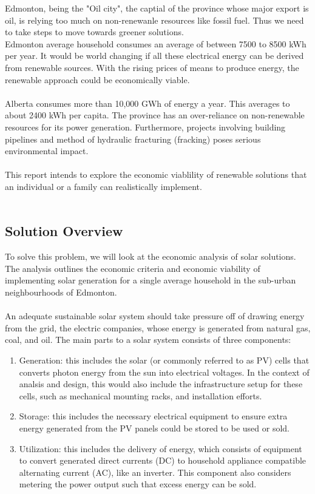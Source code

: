 \documentclass[10pt,letterpaper]{article}
\begin{document}
Edmonton, being the "Oil city", the captial of the province whose major export is oil, is relying too much on non-renewanle resources like fossil fuel. Thus we need to take steps to move towards greener solutions.\\

Edmonton average household consumes an average of between 7500 to 8500 kWh per year. It would be world changing if all these electrical energy can be derived from renewable sources. With the rising prices of means to produce energy, the renewable approach could be economically viable.\\
\\
Alberta consumes more than 10,000 GWh of energy a year. This averages to about 2400 kWh per capita\cite{average-albertan-consumption}. The province has an over-reliance on non-renewable resources for its power generation. Furthermore, projects involving building pipelines and method of hydraulic fracturing (fracking) poses serious environmental impact\cite{fracking-kurzgesagt}.\\
\\
This report intends to explore the economic viablility of renewable solutions that an individual or a family can realistically implement.\\
\\

\subsection{Solution Overview}

To solve this problem, we will look at the economic analysis of solar solutions. The analysis outlines the economic criteria and economic viability of implementing solar generation for a single average household in the sub-urban neighbourhoods of Edmonton.\\
\\
An adequate sustainable solar system should take pressure off of drawing energy from the grid, the electric companies, whose energy is generated from natural gas, coal, and oil. The main parts to a solar system consists of three components\cite{components}:

\begin{enumerate}
	\item Generation: this includes the solar (or commonly referred to as PV) cells that converts photon energy from the sun into electrical voltages. In the context of analsis and design, this would also include the infrastructure setup for these cells, such as mechanical mounting racks, and installation efforts.
	\item Storage: this includes the necessary electrical equipment to ensure extra energy generated from the PV panels could be stored to be used or sold. 
	\item Utilization: this includes the delivery of energy, which consists of equipment to convert generated direct currents (DC) to household appliance compatible alternating current (AC), like an inverter. This component also considers metering the power output such that excess energy can be sold.
\end{enumerate}
\end{document}
